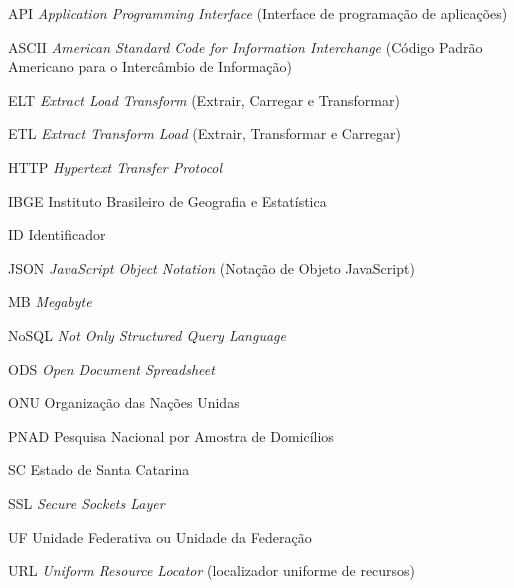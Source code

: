 \begin{siglas}
    \item[API] \textit{Application Programming Interface} (Interface de programação de aplicações)
    \item[ASCII] \textit{American Standard Code for Information Interchange} (Código Padrão Americano para o Intercâmbio de Informação)
    \item[ELT] \textit{Extract Load Transform} (Extrair, Carregar e Transformar)
    \item[ETL] \textit{Extract Transform Load} (Extrair, Transformar e Carregar)
    \item[HTTP] \textit{Hypertext Transfer Protocol} 
    \item[IBGE] Instituto Brasileiro de Geografia e Estatística
    \item[ID] Identificador
    \item[JSON] \textit{JavaScript Object Notation} (Notação de Objeto JavaScript)
    \item[MB] \textit{Megabyte} 
    \item[NoSQL] \textit{Not Only Structured Query Language}
    \item[ODS] \textit{Open Document Spreadsheet}
    \item[ONU] Organização das Nações Unidas
    \item[PNAD] Pesquisa Nacional por Amostra de Domicílios 
    \item[SC] Estado de Santa Catarina
    \item[SSL] \textit{Secure Sockets Layer}
    \item[UF] Unidade Federativa ou Unidade da Federação
    \item[URL] \textit{Uniform Resource Locator} (localizador uniforme de recursos)
  \end{siglas}
  
